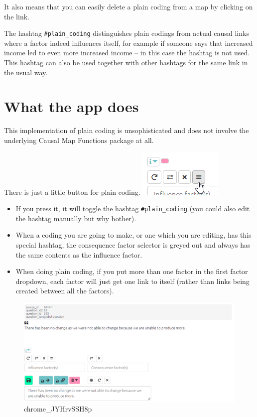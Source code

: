 \documentclass[
]{book}
\providecommand{\tightlist}{%
  \setlength{\itemsep}{0pt}\setlength{\parskip}{0pt}}
\begin{document}
It also means that you can easily delete a plain coding from a map by clicking on the link.

The hashtag \texttt{\#plain\_coding} distinguishes plain codings from actual causal links where a factor indeed influences itself, for example if someone says that increased income led to even more increased income -- in this case the hashtag is not used. This hashtag can also be used together with other hashtags for the same link in the usual way.

\hypertarget{what-the-app-does}{%
\section{What the app does}\label{what-the-app-does}}

This implementation of plain coding is unsophisticated and does not involve the underlying Causal Map Functions package at all.

There is just a little button for plain coding. \includegraphics{_assets/image-20220210155741353.png}

\begin{itemize}
\tightlist
\item
  If you press it, it will toggle the hashtag \texttt{\#plain\_coding} (you could also edit the hashtag manually but why bother).
\item
  When a coding you are going to make, or one which you are editing, has this special hashtag, the consequence factor selector is greyed out and always has the same contents as the influence factor.
\item
  When doing plain coding, if you put more than one factor in the first factor dropdown, each factor will just get one link to itself (rather than links being created between all the factors).
\end{itemize}

\begin{figure}
\centering
\includegraphics[width=6.77083in,height=\textheight]{_assets/chrome_JYHrvSSH8p.gif}
\caption{chrome\_JYHrvSSH8p}
\end{figure}
\end{document}
